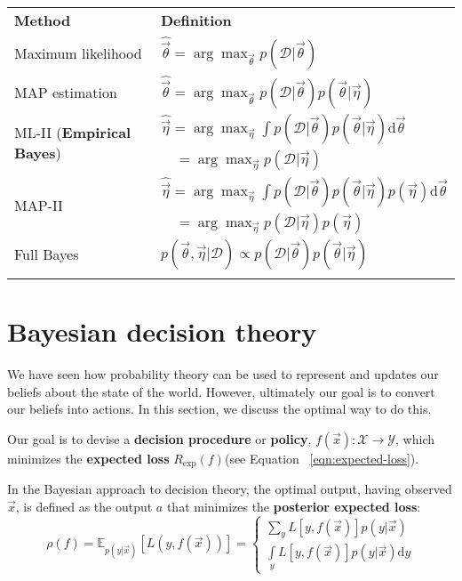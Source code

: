 \begin{table}
\centering
\begin{tabular}{ll}
\hline\noalign{\smallskip}
\textbf{Method} & \textbf{Definition} \\
\noalign{\smallskip}\svhline\noalign{\smallskip}
Maximum likelihood & $\hat{\vec{\theta}}=\arg\max_{\vec{\theta}} p(\mathcal{D}|\vec{\theta})$ \\
MAP estimation & $\hat{\vec{\theta}}=\arg\max_{\vec{\theta}} p(\mathcal{D}|\vec{\theta})p(\vec{\theta}|\vec{\eta})$ \\
\multirow{2}{*}{ML-II (\textbf{Empirical Bayes})} & $\hat{\vec{\eta}}=\arg\max_{\vec{\eta}} \int p(\mathcal{D}|\vec{\theta})p(\vec{\theta}|\vec{\eta})\mathrm{d}\vec{\theta}$ \\
                                                  & $\quad =\arg\max_{\vec{\eta}}p(\mathcal{D}|\vec{\eta})$ \\
\multirow{2}{*}{MAP-II} & $\hat{\vec{\eta}}=\arg\max_{\vec{\eta}} \int p(\mathcal{D}|\vec{\theta})p(\vec{\theta}|\vec{\eta})p(\vec{\eta})\mathrm{d}\vec{\theta}$ \\
                        & $\quad =\arg\max_{\vec{\eta}}p(\mathcal{D}|\vec{\eta})p(\vec{\eta})$ \\
Full Bayes & $p(\vec{\theta},\vec{\eta}|\mathcal{D}) \propto p(\mathcal{D}|\vec{\theta})p(\vec{\theta}|\vec{\eta})$ \\
\noalign{\smallskip}\hline
\end{tabular}
\end{table}


\section{Bayesian decision theory}
\label{sec:Bayesian-decision-theory}
We have seen how probability theory can be used to represent and updates our beliefs about the state of the world. However, ultimately our goal is to convert our beliefs into actions. In this section, we discuss the optimal way to do this.

Our goal is to devise a \textbf{decision procedure} or \textbf{policy}, $f(\vec{x}) : \mathcal{X} \rightarrow \mathcal{Y}$, which minimizes the \textbf{expected loss} $R_{\mathrm{exp}}(f)$(see Equation ~\eqref{eqn:expected-loss}).

In the Bayesian approach to decision theory, the optimal output, having observed $\vec{x}$, is defined as the output $a$ that minimizes the \textbf{posterior expected loss}:
\begin{equation}
\rho(f)=\mathbb{E}_{p(y|\vec{x})}[L(y,f(\vec{x}))]=\begin{cases}
\sum\limits_y L[y,f(\vec{x})]p(y|\vec{x}) \\
\int\limits_y L[y,f(\vec{x})]p(y|\vec{x})\mathrm{d}y
\end{cases}
\end{equation}

